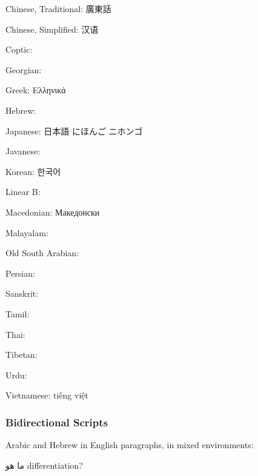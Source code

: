 

Chinese, Traditional: 廣東話 

Chinese, Simplified: 汉语 

Coptic: 

Georgian: 

Greek: Ελληνικά

Hebrew: 

Japanese: 日本語 にほんご ニホンゴ

Javanese: 

Korean: 한국어

Linear B: 

Macedonian: Македонски

Malayalam: 


Old South Arabian: 

Persian: 


Sanskrit: 

Tamil: 

Thai: 

Tibetan: 

Urdu: 

Vietnamese: tiếng việt




\subsubsection{Bidirectional Scripts}

Arabic and Hebrew in English paragraphs, in mixed environments:

ما هو \foreignlanguage{english}{differentiation}? 


